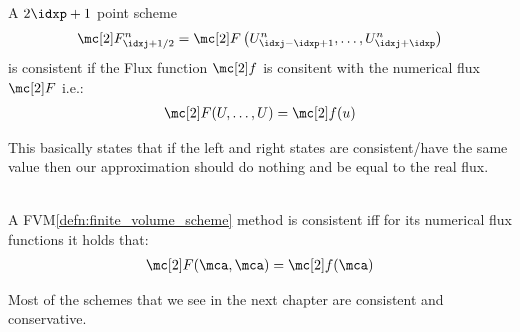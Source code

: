 \begin{defnbox}\nospacing
    \begin{defn}\label{defn:consistent_schemes}
        A $2\idxp+1$ point scheme
        \begin{align}
          \Flux_{\idxj+1/2}^{n}=\Flux \left(U_{\idxj-\idxp+1}^{n},\ldots,U_{\idxj+\idxp}^{n}\right)
        \end{align}
        is consistent if the Flux function $\flux$ is consitent with the numerical flux $\Flux$ i.e.:
        \begin{align}
          \Flux(U,\ldots,U)=\flux(u)
        \end{align}
    \end{defn}
\end{defnbox}
\begin{explanationbox}\nospacing
    \begin{explanation}
        This basically states that if the left and right states are consistent/have the same value then
        our approximation should do nothing and be equal to the real flux.
    \end{explanation}
\end{explanationbox}
\begin{corbox}\nospacing
    \begin{cor}\label{cor:consitency_for_fvm}\leavevmode\\
        A FVM\cref{defn:finite_volume_scheme} method is consistent iff for its numerical flux functions it holds that:
        \begin{align}
          \Flux(\mca,\mca)=\flux(\mca)
        \end{align}
    \end{cor}
\end{corbox}
\begin{notebox}[Note]\nospacing
    Most of the schemes that we see in the next chapter are consistent and conservative.
\end{notebox}
